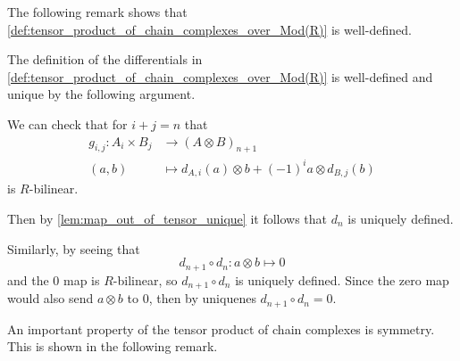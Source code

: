 The following remark shows that \autoref{def:tensor_product_of_chain_complexes_over_Mod(R)} is well-defined.

\begin{remark}
    The definition of the differentials in \autoref{def:tensor_product_of_chain_complexes_over_Mod(R)} is well-defined and unique by the following argument.

    We can check that for \( i + j = n \) that
    \begin{align*}
        g_{i, j}: A_i \times B_j &\to (A \otimes B)_{n + 1} \\
        (a, b) &\mapsto d_{A, i}(a) \otimes b + (-1)^i a \otimes d_{B, j}(b)
    \end{align*}
    is \( R \)-bilinear.

    Then by \autoref{lem:map_out_of_tensor_unique} it follows that \( d_n \) is uniquely defined.

    Similarly, by seeing that
    \[
        d_{n + 1} \circ d_n: a \otimes b \mapsto 0
    \]
    and the \( 0 \) map is \( R \)-bilinear, so \( d_{n + 1} \circ d_n \) is uniquely defined. Since the zero map would also send \( a \otimes b \) to \( 0 \), then by uniquenes \( d_{n + 1} \circ d_n = 0 \).
\end{remark}

An important property of the tensor product of chain complexes is symmetry. This is shown in the following remark.

